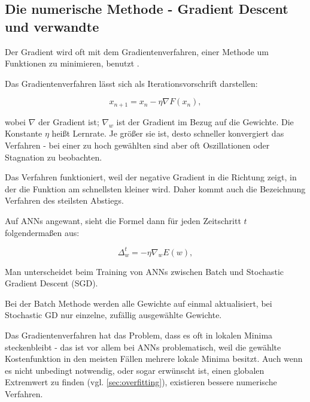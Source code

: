 \subsection{Die numerische Methode - Gradient Descent und verwandte}

Der Gradient wird oft mit dem Gradientenverfahren, einer Methode um Funktionen zu minimieren, benutzt \cite{bishop1995neural,bengio2012practical} 
.

Das Gradientenverfahren lässt sich als Iterationsvorschrift darstellen:

\begin{equation}
x_{n+1}=x_n- \eta  \nabla F(x_n), 
\end{equation}

wobei $\nabla$ der Gradient ist; $\nabla_w$ ist der Gradient im Bezug auf die Gewichte. 
Die Konstante $\eta$ heißt Lernrate. Je größer sie ist, desto schneller konvergiert das Verfahren - bei einer zu hoch gewählten sind aber oft Oszillationen oder Stagnation zu beobachten. 

Das Verfahren funktioniert, weil der negative Gradient in die Richtung zeigt, in der die Funktion am schnellsten kleiner wird. Daher kommt auch die Bezeichnung Verfahren des steilsten Abstiegs.

Auf ANNs angewant, sieht die Formel dann für jeden Zeitschritt $t$ folgendermaßen aus:

\begin{equation}
  \Delta_w^t = - \eta  \nabla_w E(w),
\end{equation}





Man unterscheidet beim Training von ANNs zwischen Batch und Stochastic Gradient Descent (SGD).

Bei der Batch Methode werden alle Gewichte auf einmal aktualisiert, bei Stochastic GD nur einzelne, zufällig ausgewählte Gewichte.

Das Gradientenverfahren hat das Problem, dass es oft in lokalen Minima steckenbleibt - das ist vor allem bei ANNs problematisch, weil die gewählte Kostenfunktion in den meisten Fällen mehrere lokale Minima besitzt. Auch wenn es nicht unbedingt notwendig, oder sogar erwünscht ist, einen globalen Extremwert zu finden (vgl. \ref{sec:overfitting}), existieren bessere numerische Verfahren. 

